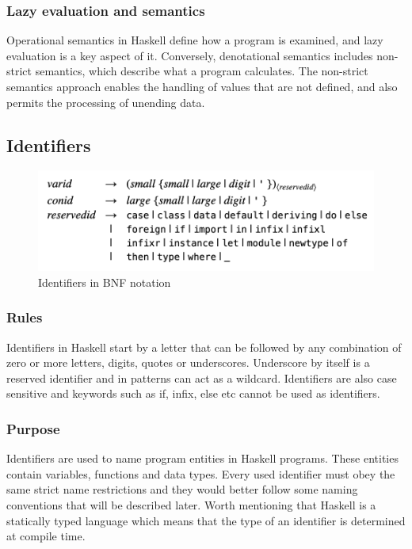 \documentclass[a4paper, titlepage, twoside]{article}
\begin{document}
\subsubsection{Lazy evaluation and semantics}
\label{sec:org42947b0}

Operational semantics in Haskell define how a program is examined, and lazy evaluation is a key aspect of it. Conversely, denotational semantics includes non-strict semantics, which describe what a program calculates. The non-strict semantics approach enables the handling of values that are not defined, and also permits the processing of unending data.

\subsection{Identifiers}
\label{sec:org18ca967}

\begin{figure}[htbp]
\centering
\includegraphics[width=.9\linewidth]{img/2023-05-22_21-55-01_screenshot.png}
\caption{Identifiers in BNF notation \autocite[section 2.4]{marlowHaskell2010Language2010}}
\end{figure}


\subsubsection{Rules}
\label{sec:org758eb74}

Identifiers in Haskell start by a letter that can be followed by any combination of zero or more letters, digits, quotes or underscores. Underscore by itself is a reserved identifier and in patterns can act as a wildcard. Identifiers are also case sensitive and keywords such as if, infix, else etc cannot be used as identifiers.

\subsubsection{Purpose}
\label{sec:orgeebd305}

Identifiers are used to name program entities in Haskell programs. These entities contain variables, functions and data types. Every used identifier must obey the same strict name restrictions and they would better follow some naming conventions that will be described later. Worth mentioning that Haskell is a statically typed language which means that the type of an identifier is determined at compile time.
\end{document}
